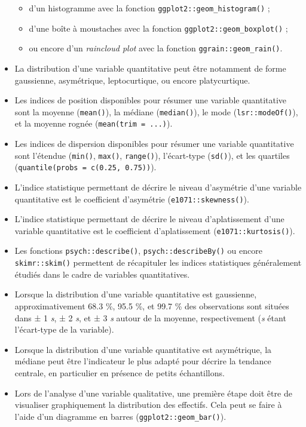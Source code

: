 \documentclass[
]{book}
\providecommand{\tightlist}{%
  \setlength{\itemsep}{0pt}\setlength{\parskip}{0pt}}
\begin{document}
\begin{itemize}
  \begin{itemize}
  \tightlist
  \item
    d'un histogramme avec la fonction \texttt{ggplot2::geom\_histogram()} ;
  \item
    d'une boîte à moustaches avec la fonction \texttt{ggplot2::geom\_boxplot()} ;
  \item
    ou encore d'un \emph{raincloud plot} avec la fonction \texttt{ggrain::geom\_rain()}.
  \end{itemize}
\item
  La distribution d'une variable quantitative peut être notamment de forme gaussienne, asymétrique, leptocurtique, ou encore platycurtique.
\item
  Les indices de position disponibles pour résumer une variable quantitative sont la moyenne (\texttt{mean()}), la médiane (\texttt{median()}), le mode (\texttt{lsr::modeOf()}), et la moyenne rognée (\texttt{mean(trim\ =\ ...)}).
\item
  Les indices de dispersion disponibles pour résumer une variable quantitative sont l'étendue (\texttt{min()}, \texttt{max()}, \texttt{range()}), l'écart-type (\texttt{sd()}), et les quartiles (\texttt{quantile(probs\ =\ c(0.25,\ 0.75))}).
\item
  L'indice statistique permettant de décrire le niveau d'asymétrie d'une variable quantitative est le coefficient d'asymétrie (\texttt{e1071::skewness()}).
\item
  L'indice statistique permettant de décrire le niveau d'aplatissement d'une variable quantitative est le coefficient d'aplatissement (\texttt{e1071::kurtosis()}).
\item
  Les fonctions \texttt{psych::describe()}, \texttt{psych::describeBy()} ou encore \texttt{skimr::skim()} permettent de récapituler les indices statistiques généralement étudiés dans le cadre de variables quantitatives.
\item
  Lorsque la distribution d'une variable quantitative est gaussienne, approximativement 68.3 \%, 95.5 \%, et 99.7 \% des observations sont situées dans ± 1 \emph{s}, ± 2 \emph{s}, et ± 3 \emph{s} autour de la moyenne, respectivement (\emph{s} étant l'écart-type de la variable).
\item
  Lorsque la distribution d'une variable quantitative est asymétrique, la médiane peut être l'indicateur le plus adapté pour décrire la tendance centrale, en particulier en présence de petits échantillons.
\item
  Lors de l'analyse d'une variable qualitative, une première étape doit être de visualiser graphiquement la distribution des effectifs. Cela peut se faire à l'aide d'un diagramme en barres (\texttt{ggplot2::geom\_bar()}).

\end{itemize}
\end{document}
